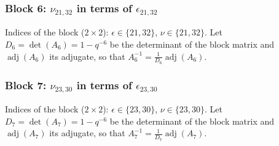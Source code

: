 \subsubsection{Block 6: $\nu_{21, 32}$ in terms of $\epsilon_{21, 32}$}
Indices of the block ($2\times 2$): $\epsilon \in \{21, 32\}$, $\nu \in \{21, 32\}$.
Let $D_{6} = \det(A_{6}) = 1-q^{-6}$ be the determinant of the block matrix and $\operatorname{adj}(A_{6})$ its adjugate, so that $A_{6}^{-1} = \frac{1}{D_{6}}\operatorname{adj}(A_{6})$.
\begin{center}
\end{center}

\subsubsection{Block 7: $\nu_{23, 30}$ in terms of $\epsilon_{23, 30}$}
Indices of the block ($2\times 2$): $\epsilon \in \{23, 30\}$, $\nu \in \{23, 30\}$.
Let $D_{7} = \det(A_{7}) = 1-q^{-6}$ be the determinant of the block matrix and $\operatorname{adj}(A_{7})$ its adjugate, so that $A_{7}^{-1} = \frac{1}{D_{7}}\operatorname{adj}(A_{7})$.
\begin{center}
\end{center}

